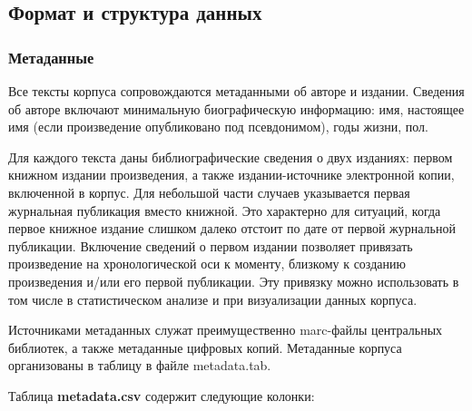 \documentclass[
]{article}
\begin{document}
\hypertarget{ux444ux43eux440ux43cux430ux442-ux438-ux441ux442ux440ux443ux43aux442ux443ux440ux430-ux434ux430ux43dux43dux44bux445}{%
\subsection{Формат и структура
данных}\label{ux444ux43eux440ux43cux430ux442-ux438-ux441ux442ux440ux443ux43aux442ux443ux440ux430-ux434ux430ux43dux43dux44bux445}}

\hypertarget{ux43cux435ux442ux430ux434ux430ux43dux43dux44bux435}{%
\subsubsection{Метаданные}\label{ux43cux435ux442ux430ux434ux430ux43dux43dux44bux435}}

Все тексты корпуса сопровождаются метаданными об авторе и издании.
Сведения об авторе включают минимальную биографическую информацию: имя,
настоящее имя (если произведение опубликовано под псевдонимом), годы
жизни, пол.

Для каждого текста даны библиографические сведения о двух изданиях:
первом книжном издании произведения, а также издании-источнике
электронной копии, включенной в корпус. Для небольшой части случаев
указывается первая журнальная публикация вместо книжной. Это характерно
для ситуаций, когда первое книжное издание слишком далеко отстоит по
дате от первой журнальной публикации. Включение сведений о первом
издании позволяет привязать произведение на хронологической оси к
моменту, близкому к созданию произведения и/или его первой публикации.
Эту привязку можно использовать в том числе в статистическом анализе и
при визуализации данных корпуса.

Источниками метаданных служат преимущественно marc-файлы центральных
библиотек, а также метаданные цифровых копий. Метаданные корпуса
организованы в таблицу в файле metadata.tab.

Таблица \textbf{metadata.csv} содержит следующие колонки:
\end{document}
